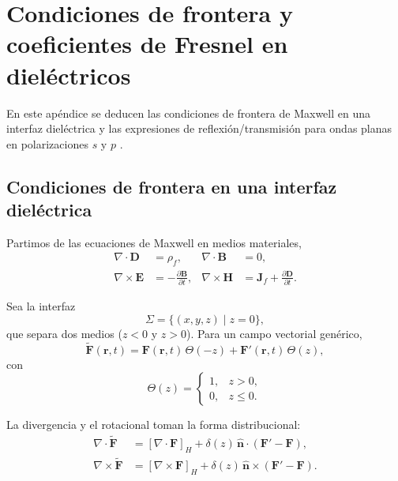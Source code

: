 \chapter{Condiciones de frontera y coeficientes de Fresnel en dieléctricos}
\label{sec:appendix_maxwell_frontera_fresnel}
\label{sec:boundary_conditions_in_dielectrics}

En este apéndice se deducen las condiciones de frontera de Maxwell en una interfaz dieléctrica y las expresiones de reflexión/transmisión para ondas planas en polarizaciones $s$ y $p$ \cite{jackson1999,zangwill2013}.

\section{Condiciones de frontera en una interfaz dieléctrica}
\label{subsec:apx_condiciones_frontera}

Partimos de las ecuaciones de Maxwell en medios materiales,
\begin{equation}
\begin{aligned}
\nabla \cdot \mathbf{D} &= \rho_f, & \nabla \cdot \mathbf{B} &= 0, \\
\nabla \times \mathbf{E} &= -\frac{\partial \mathbf{B}}{\partial t},
& \nabla \times \mathbf{H} &= \mathbf{J}_f + \frac{\partial \mathbf{D}}{\partial t}.
\end{aligned}
\label{eq:apx_maxwell_materiales}
\end{equation}

Sea la interfaz
\begin{equation}
\Sigma = \{(x,y,z)\mid z=0\},
\end{equation}
que separa dos medios ($z<0$ y $z>0$). Para un campo vectorial genérico,
\begin{equation}
\tilde{\mathbf F}(\mathbf r,t)
=
\mathbf F(\mathbf r,t)\,\Theta(-z)
+
\mathbf F'(\mathbf r,t)\,\Theta(z),
\label{eq:apx_campo_partido}
\end{equation}
con
\begin{equation}
\Theta(z)=
\begin{cases}
1, & z>0,\\
0, & z\le 0.
\end{cases}
\end{equation}

La divergencia y el rotacional toman la forma distribucional:
\begin{align}
\nabla\cdot\tilde{\mathbf F}
&=
\left[\nabla\cdot\mathbf F\right]_H
+
\delta(z)\,\hat{\mathbf n}\cdot\left(\mathbf F'-\mathbf F\right),
\label{eq:apx_div_partida}\\
\nabla\times\tilde{\mathbf F}
&=
\left[\nabla\times\mathbf F\right]_H
+
\delta(z)\,\hat{\mathbf n}\times\left(\mathbf F'-\mathbf F\right).
\label{eq:apx_rot_partida}
\end{align}

